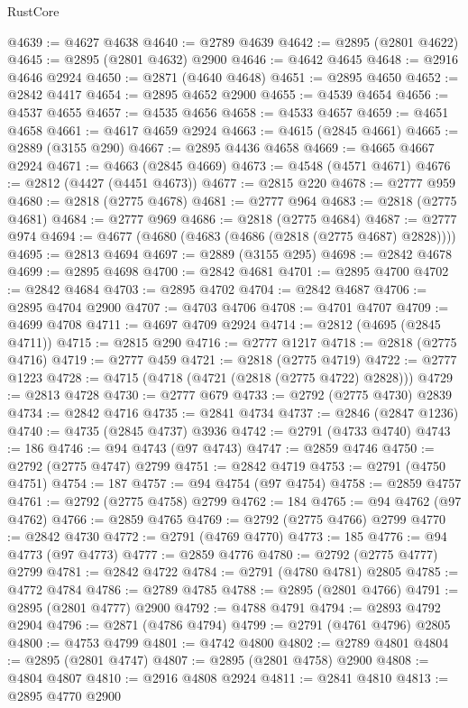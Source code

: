 \begin{lexlean}{RustCore}
\begin{coremodule}
@4639 := @4627 @4638
@4640 := @2789 @4639
@4642 := @2895 (@2801 @4622)
@4645 := @2895 (@2801 @4632) @2900
@4646 := @4642 @4645
@4648 := @2916 @4646 @2924
@4650 := @2871 (@4640 @4648)
@4651 := @2895 @4650
@4652 := @2842 @4417
@4654 := @2895 @4652 @2900
@4655 := @4539 @4654
@4656 := @4537 @4655
@4657 := @4535 @4656
@4658 := @4533 @4657
@4659 := @4651 @4658
@4661 := @4617 @4659 @2924
@4663 := @4615 (@2845 @4661)
@4665 := @2889 (@3155 @290)
@4667 := @2895 @4436 @4658
@4669 := @4665 @4667 @2924
@4671 := @4663 (@2845 @4669)
@4673 := @4548 (@4571 @4671)
@4676 := @2812 (@4427 (@4451 @4673))
@4677 := @2815 @220
@4678 := @2777 @959
@4680 := @2818 (@2775 @4678)
@4681 := @2777 @964
@4683 := @2818 (@2775 @4681)
@4684 := @2777 @969
@4686 := @2818 (@2775 @4684)
@4687 := @2777 @974
@4694 := @4677 (@4680 (@4683 (@4686 (@2818 (@2775 @4687) @2828))))
@4695 := @2813 @4694
@4697 := @2889 (@3155 @295)
@4698 := @2842 @4678
@4699 := @2895 @4698
@4700 := @2842 @4681
@4701 := @2895 @4700
@4702 := @2842 @4684
@4703 := @2895 @4702
@4704 := @2842 @4687
@4706 := @2895 @4704 @2900
@4707 := @4703 @4706
@4708 := @4701 @4707
@4709 := @4699 @4708
@4711 := @4697 @4709 @2924
@4714 := @2812 (@4695 (@2845 @4711))
@4715 := @2815 @290
@4716 := @2777 @1217
@4718 := @2818 (@2775 @4716)
@4719 := @2777 @459
@4721 := @2818 (@2775 @4719)
@4722 := @2777 @1223
@4728 := @4715 (@4718 (@4721 (@2818 (@2775 @4722) @2828)))
@4729 := @2813 @4728
@4730 := @2777 @679
@4733 := @2792 (@2775 @4730) @2839
@4734 := @2842 @4716
@4735 := @2841 @4734
@4737 := @2846 (@2847 @1236)
@4740 := @4735 (@2845 @4737) @3936
@4742 := @2791 (@4733 @4740)
@4743 := 186
@4746 := @94 @4743 (@97 @4743)
@4747 := @2859 @4746
@4750 := @2792 (@2775 @4747) @2799
@4751 := @2842 @4719
@4753 := @2791 (@4750 @4751)
@4754 := 187
@4757 := @94 @4754 (@97 @4754)
@4758 := @2859 @4757
@4761 := @2792 (@2775 @4758) @2799
@4762 := 184
@4765 := @94 @4762 (@97 @4762)
@4766 := @2859 @4765
@4769 := @2792 (@2775 @4766) @2799
@4770 := @2842 @4730
@4772 := @2791 (@4769 @4770)
@4773 := 185
@4776 := @94 @4773 (@97 @4773)
@4777 := @2859 @4776
@4780 := @2792 (@2775 @4777) @2799
@4781 := @2842 @4722
@4784 := @2791 (@4780 @4781) @2805
@4785 := @4772 @4784
@4786 := @2789 @4785
@4788 := @2895 (@2801 @4766)
@4791 := @2895 (@2801 @4777) @2900
@4792 := @4788 @4791
@4794 := @2893 @4792 @2904
@4796 := @2871 (@4786 @4794)
@4799 := @2791 (@4761 @4796) @2805
@4800 := @4753 @4799
@4801 := @4742 @4800
@4802 := @2789 @4801
@4804 := @2895 (@2801 @4747)
@4807 := @2895 (@2801 @4758) @2900
@4808 := @4804 @4807
@4810 := @2916 @4808 @2924
@4811 := @2841 @4810
@4813 := @2895 @4770 @2900

\end{coremodule}
\end{lexlean}
